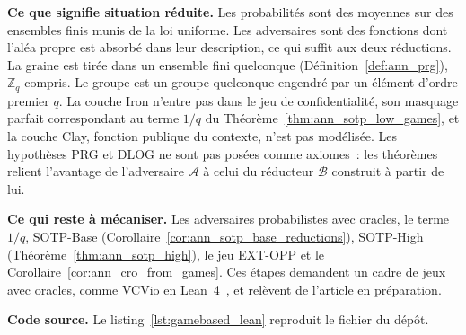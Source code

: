 \begin{sloppypar}
\medskip
\noindent\textbf{Ce que signifie \og situation r\'eduite\fg.} Les probabilit\'es sont des
moyennes sur des ensembles finis munis de la loi uniforme. Les adversaires sont des
fonctions dont l'al\'ea propre est absorb\'e dans leur description, ce qui suffit aux
deux r\'eductions. La graine est tir\'ee dans un ensemble fini quelconque
(D\'efinition~\ref{def:ann_prg}), $\mathbb{Z}_q$ compris. Le groupe est un groupe
quelconque engendr\'e par un \'el\'ement d'ordre premier $q$. La couche Iron n'entre pas
dans le jeu de confidentialit\'e, son masquage parfait correspondant au terme $1/q$ du
Th\'eor\`eme~\ref{thm:ann_sotp_low_games}, et la couche Clay, fonction publique du
contexte, n'est pas mod\'elis\'ee. Les hypoth\`eses PRG et DLOG ne sont pas pos\'ees comme
axiomes~: les th\'eor\`emes relient l'avantage de l'adversaire $\mathcal{A}$ \`a celui du
r\'educteur $\mathcal{B}$ construit \`a partir de lui.

\medskip
\noindent\textbf{Ce qui reste \`a m\'ecaniser.} Les adversaires probabilistes avec
oracles, le terme $1/q$, SOTP-Base (Corollaire~\ref{cor:ann_sotp_base_reductions}),
SOTP-High (Th\'eor\`eme~\ref{thm:ann_sotp_high}), le jeu EXT-OPP et le
Corollaire~\ref{cor:ann_cro_from_games}. Ces \'etapes demandent un cadre de jeux avec
oracles, comme VCVio en Lean~4~\cite{VCVio2026}, et rel\`event de l'article en
pr\'eparation.

\medskip
\noindent\textbf{Code source.} Le listing~\ref{lst:gamebased_lean} reproduit le fichier
du d\'ep\^ot.
\end{sloppypar}

